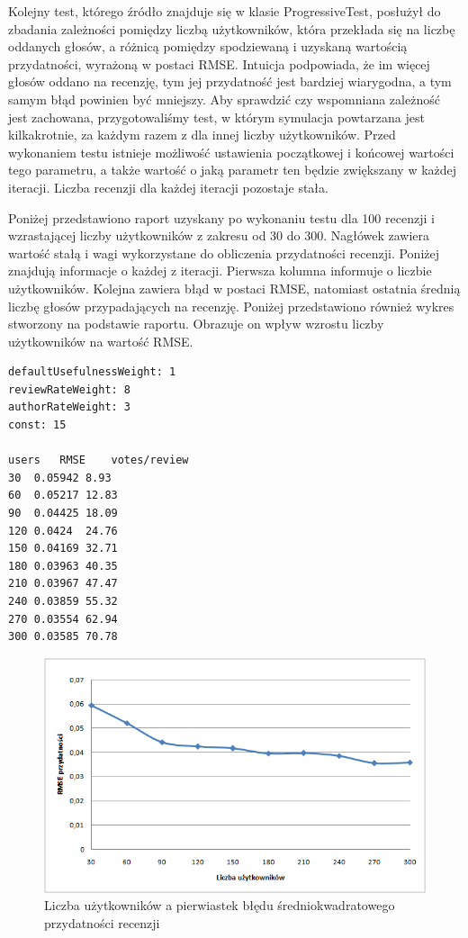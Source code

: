 Kolejny test, którego źródło znajduje się w klasie ProgressiveTest, posłużył do zbadania zależności pomiędzy liczbą użytkowników, która przekłada się na liczbę oddanych głosów, a różnicą pomiędzy spodziewaną i uzyskaną wartością przydatności, wyrażoną w postaci RMSE. Intuicja podpowiada, że im więcej głosów oddano na recenzję, tym jej przydatność jest bardziej wiarygodna, a tym samym błąd powinien być mniejszy. Aby sprawdzić czy wspomniana zależność jest zachowana, przygotowaliśmy test, w którym symulacja powtarzana jest kilkakrotnie, za każdym razem z dla innej liczby użytkowników. Przed wykonaniem testu istnieje możliwość ustawienia początkowej i końcowej wartości tego parametru, a także wartość o jaką parametr ten będzie zwiększany w każdej iteracji. Liczba recenzji dla każdej iteracji pozostaje stała.


Poniżej przedstawiono raport uzyskany po wykonaniu testu dla 100 recenzji i wzrastającej liczby użytkowników z zakresu od 30 do 300. Nagłówek zawiera wartość stałą i wagi wykorzystane do obliczenia przydatności recenzji. Poniżej znajdują informacje o każdej z iteracji. Pierwsza kolumna informuje o liczbie użytkowników. Kolejna zawiera błąd w postaci RMSE, natomiast ostatnia średnią liczbę głosów przypadających na recenzję. Poniżej przedstawiono również wykres stworzony na podstawie raportu. Obrazuje on wpływ wzrostu liczby użytkowników na wartość RMSE.

\begin{lstlisting}
defaultUsefulnessWeight: 1
reviewRateWeight: 8
authorRateWeight: 3
const: 15

users	RMSE	votes/review	
30	0.05942	8.93
60	0.05217	12.83
90	0.04425	18.09
120	0.0424	24.76
150	0.04169	32.71
180	0.03963	40.35
210	0.03967	47.47
240	0.03859	55.32
270	0.03554	62.94
300	0.03585	70.78
\end{lstlisting}

\begin{figure}[h]
	\centering
	\includegraphics[scale=0.7]{images/ProgressiveTest.png}
	\caption{Liczba użytkowników a pierwiastek błędu średniokwadratowego przydatności recenzji}
\end{figure}

